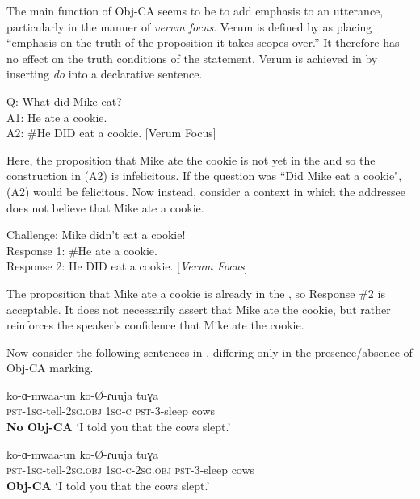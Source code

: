 \documentclass[output=paper
,newtxmath
,modfonts
,nonflat]{langsci/langscibook}
\begin{document}
The main function of Obj-CA seems to be to add emphasis to an utterance, particularly in the manner of \textit{verum focus}. Verum  is defined by \citet{Hohle:1992} as placing ``emphasis on the truth of the proposition it takes scopes over.'' It therefore has no effect on the truth conditions of the statement. Verum  is achieved in  by inserting \textit{do} into a declarative sentence. 

\ea \label{No-VF English}
Q: What did Mike eat? \\
A1: He ate a cookie. \\
A2: \#He DID eat a cookie. \hfill [Verum Focus]
\z

\noindent Here, the proposition that Mike ate the cookie is not yet in the  and so the  construction in (A2) is infelicitous. If the question was ``Did Mike eat a cookie", (A2) would be felicitous. Now instead, consider a context in which the addressee does not believe that Mike ate a cookie.

\ea \label{VF English}
Challenge: Mike didn't eat a cookie! \\
Response 1: \#He ate a cookie. \\
Response 2: He DID eat a cookie. \hfill [\textit{Verum Focus}]
\z

\noindent The proposition that Mike ate a cookie is already in the , so Response \#2 is acceptable. It does not necessarily assert that Mike ate the cookie, but rather reinforces the speaker's confidence that Mike ate the cookie.  

Now consider the following sentences in , differing only in the presence/absence of Obj-CA marking.

\ea \label{Obj-CA Contexts} 
\begin{xlist}

\ex \label{Obj-CA 1}
\gll ko-ɑ-mwaa-un  ko-\O-ɾuuja tuɣa \\
\textsc{pst}-1\textsc{sg}-tell-2\textsc{sg}.\textsc{obj} 1\textsc{sg-c} \textsc{pst}-3-sleep cows \\
\hfill \textbf{No Obj-CA}
\glt `I told you that the cows slept.'
	
\ex \label{Obj-CA 2}
\gll ko-ɑ-mwaa-un  ko-\O-ɾuuja tuɣa \\
\textsc{pst}-1\textsc{sg}-tell-2\textsc{sg}.\textsc{obj} 1\textsc{sg-c-}2\textsc{sg}.\textsc{obj} \textsc{pst}-3-sleep cows \\
\hfill \textbf{Obj-CA}
\glt `I told you that the cows slept.'

\end{xlist}
\z
\end{document}
